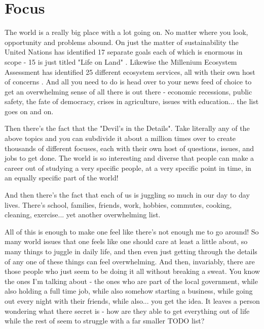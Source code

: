 \documentclass[11pt,a5paper]{book}
\begin{document}
\chapter{Focus}
The world is a really big place with a lot going on. No matter where you look, opportunity and problems abound. On just the matter of sustainability the United Nations has identified 17 separate goals each of which is enormous in scope - 15 is just titled "Life on Land" \cite{united}. Likewise the Millenium Ecosystem Assessment has identified 25 different ecosystem services, all with their own host of concerns \cite{mas}. And all you need to do is head over to your news feed of choice to get an overwhelming sense of all there is out there - economic recessions, public safety, the fate of democracy, crises in agriculture, issues with education... the list goes on and on.
\newline

Then there's the fact that the "Devil's in the Details". Take literally any of the above topics and you can subdivide it about a million times over to create thousands of different focuses, each with their own host of questions, issues, and jobs to get done. The world is so interesting and diverse that people can make a career out of studying a very specific people, at a very specific point in time, in an equally specific part of the world! 
\newline

And then there's the fact that each of us is juggling so much in our day to day lives. There's school, families, friends, work, hobbies, commutes, cooking, cleaning, exercise... yet another overwhelming list. 
\newline

All of this is enough to make one feel like there's not enough me to go around! So many world issues that one feels like one should care at least a little about, so many things to juggle in daily life, and then even just getting through the details of any one of these things can feel overwhelming. And then, invariably, there are those people who just seem to be doing it all without breaking a sweat. You know the ones I'm talking about - the ones who are part of the local government, while also holding a full time job, while also somehow starting a business, while going out every night with their friends, while also... you get the idea. It leaves a person wondering what there secret is - how are they able to get everything out of life while the rest of seem to struggle with a far smaller TODO list?
\newline
\end{document}
